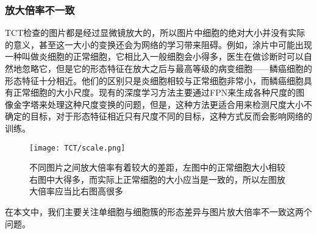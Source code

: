 \subsubsection{放大倍率不一致}
\par TCT检查的图片都是经过显微镜放大的，所以图片中细胞的绝对大小并没有实际的意义，甚至这一大小的变换还会为网络的学习带来阻碍。例如，涂片中可能出现一种叫做炎细胞的正常细胞，它相比入一般细胞会小得多，医生在做诊断时可以自然地忽略它，但是它的形态特征在放大之后与最高等级的病变细胞——鳞癌细胞的形态特征十分相近。他们的区别只是炎细胞相较与正常细胞非常小，而鳞癌细胞具有正常细胞的大小尺度。现有的深度学习方法主要通过FPN来生成各种尺度的图像金字塔来处理这种尺度变换的问题，但是，这种方法更适合用来检测尺度大小不确定的目标，对于形态特征相近只有尺度不同的目标，这种方式反而会影响网络的训练。
\begin{figure}[h]
    \centering
    \texttt{[image: TCT/scale.png]}
    \caption{不同图片之间放大倍率有着较大的差距，左图中的正常细胞大小相较右图中大得多，而实际上正常细胞的大小应当是一致的，所以左图放大倍率应当比右图高很多}
    \label{论文倍率差异}
\end{figure}
\par 在本文中，我们主要关注单细胞与细胞簇的形态差异与图片放大倍率不一致这两个问题。
